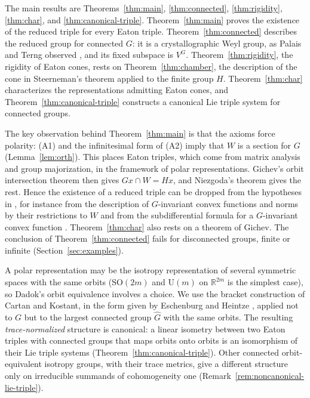 \documentclass[11pt]{amsart}
\theoremstyle{plain}
\theoremstyle{definition}
\theoremstyle{remark}
\newcommand{\R}{\mathbb R}
\begin{document}
The main results are Theorems~\ref{thm:main}, \ref{thm:connected}, \ref{thm:rigidity}, \ref{thm:char}, and \ref{thm:canonical-triple}. Theorem~\ref{thm:main} proves the existence of the reduced triple for every Eaton triple. Theorem~\ref{thm:connected} describes the reduced group for connected $G$: it is a crystallographic Weyl group, as Palais and Terng observed \cite[Corollary 4.7]{PT}, and its fixed subspace is $V^G$. Theorem~\ref{thm:rigidity}, the rigidity of Eaton cones, rests on Theorem~\ref{thm:chamber}, the description of the cone in Steerneman's theorem applied to the finite group $H$. Theorem~\ref{thm:char} characterizes the representations admitting Eaton cones, and Theorem~\ref{thm:canonical-triple} constructs a canonical Lie triple system for connected groups.

The key observation behind Theorem~\ref{thm:main} is that the axioms force polarity: (A1) and the infinitesimal form of (A2) imply that $W$ is a section for $G$ (Lemma~\ref{lem:orth}). This places Eaton triples, which come from matrix analysis and group majorization, in the framework of polar representations. Gichev's orbit intersection theorem \cite[Proposition 2]{Gichev} then gives $Gx\cap W=Hx$, and Niezgoda's theorem gives the rest. Hence the existence of a reduced triple can be dropped from the hypotheses in \cite{Tam,TamHill,NiemiecTam,DolberryTam}, for instance from the description of $G$-invariant convex functions and norms by their restrictions to $W$ \cite[Theorems 4, 6 and 7]{TamHill} and from the subdifferential formula for a $G$-invariant convex function \cite[Theorem 4.9]{DolberryTam}. Theorem~\ref{thm:char} also rests on a theorem of Gichev. The conclusion of Theorem~\ref{thm:connected} fails for disconnected groups, finite or infinite (Section~\ref{sec:examples}).

A polar representation may be the isotropy representation of several symmetric spaces with the same orbits ($\mathrm{SO}(2m)$ and $\mathrm{U}(m)$ on $\R^{2m}$ is the simplest case), so Dadok's orbit equivalence involves a choice. We use the bracket construction of Cartan and Kostant, in the form given by Eschenburg and Heintze \cite[Sections~3--4, especially Lemma~4.1]{EH}, applied not to $G$ but to the largest connected group $\widehat G$ with the same orbits. The resulting \emph{trace-normalized} structure is canonical: a linear isometry between two Eaton triples with connected groups that maps orbits onto orbits is an isomorphism of their Lie triple systems (Theorem~\ref{thm:canonical-triple}). Other connected orbit-equivalent isotropy groups, with their trace metrics, give a different structure only on irreducible summands of cohomogeneity one (Remark~\ref{rem:noncanonical-lie-triple}).
\end{document}
